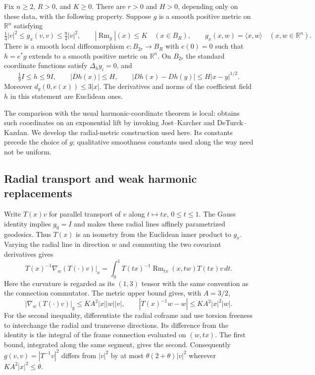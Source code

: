 \begin{theorem}\label{thm:rf-harmonic-radius}
Fix $n\geq2$, $R>0$, and $K\geq0$.  There are $r>0$ and $H>0$,
depending only on these data, with the following property.  Suppose
$g$ is a smooth positive metric on $\mathbb R^n$ satisfying
\[
 \tfrac14|v|^2\leq g_x(v,v)\leq\tfrac94|v|^2,
 \qquad |\operatorname{Rm}_g|(x)\leq K\quad(x\in B_R),
 \qquad g_x(x,w)=\langle x,w\rangle\quad(x,w\in\mathbb R^n).
\]
There is a smooth local diffeomorphism $e:B_{2r}\to B_R$ with
$e(0)=0$ such that $h=e^*g$ extends to a smooth positive metric on
$\mathbb R^n$.  On $B_{2r}$ the standard coordinate functions
satisfy $\Delta_h y_i=0$, and
\[
 \tfrac19 I\leq h\leq9I,\qquad
 |Dh(x)|\leq H,\qquad
 |Dh(x)-Dh(y)|\leq H|x-y|^{1/2}.
\]
Moreover $d_g(0,e(x))\leq3|x|$.  The derivatives and norms of
the coefficient field $h$ in this statement are Euclidean ones.
\end{theorem}

The comparison with the usual harmonic-coordinate theorem is local:
\cite[Proposition 26.49, Step 3, equations (26.146)--(26.150),
pp.~383--384]{ChowEtAl2010} obtains such coordinates on an exponential
lift by invoking Jost--Karcher and DeTurck--Kazdan.  We develop the
radial-metric construction used here.  Its constants precede the
choice of $g$; qualitative smoothness constants used along the way
need not be uniform.

\subsection{Radial transport and weak harmonic replacements}
\label{sec:rf-weak-harmonic-replacements}

Write $T(x)v$ for parallel transport of $v$ along $t\mapsto tx$,
$0\leq t\leq1$.  The Gauss identity implies $g_0=I$ and makes
these radial lines affinely parametrized geodesics.  Thus $T(x)$
is an isometry from the Euclidean inner product to $g_x$.  Varying
the radial line in direction $w$ and commuting the two covariant
derivatives gives
\[
 T(x)^{-1}\nabla_w(T(\cdot)v)|_x
 =\int_0^1T(tx)^{-1}
       \operatorname{Rm}_{tx}(x,tw)T(tx)v\,dt.
\]
Here the curvature is regarded as its $(1,3)$ tensor with the
same convention as the connection commutator.  The metric upper
bound gives, with $A=3/2$,
\begin{equation}\label{eq:rf-radial-frame}
 |\nabla_w(T(\cdot)v)|_g\leq KA^2|x||w||v|,
 \qquad |T(x)^{-1}w-w|\leq KA^2|x|^2|w|.
\end{equation}
For the second inequality, differentiate the radial coframe and
use torsion freeness to interchange the radial and transverse
directions.  Its difference from the identity is the integral of
the frame connection evaluated on $(w,tx)$.  The first bound,
integrated along the same segment, gives the second.  Consequently
$g(v,v)=|T^{-1}v|^2$ differs from $|v|^2$ by at most
$\theta(2+\theta)|v|^2$ wherever $KA^2|x|^2\leq\theta$.

